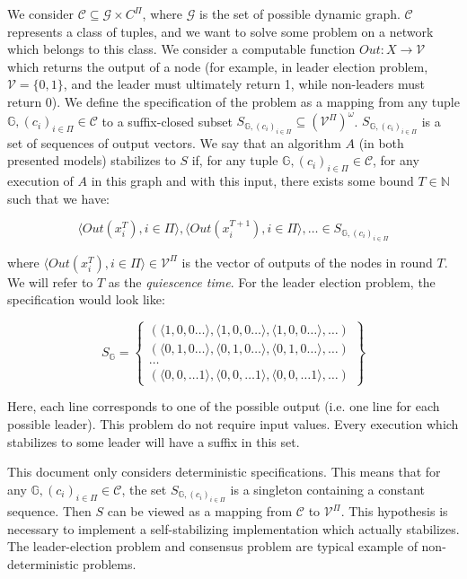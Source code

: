 \documentclass[11pt,letterpaper]{article}
\begin{document}
We consider $\mathcal{C} \subseteq \mathcal{G} \times C^\Pi$, where $\mathcal{G}$ is the set of possible dynamic graph.
$\mathcal{C}$ represents a class of tuples, and we want to solve some problem on a network which belongs to this class.
We consider a computable function $Out : X \rightarrow \mathcal{V}$ which returns the output of a node
(for example, in leader election problem, $\mathcal{V} = \{0,1\}$, and the leader must ultimately return 1, while non-leaders must return 0).
We define the specification of the problem as a mapping from any tuple $\mathds{G}, (c_i)_{i \in \Pi} \in \mathcal{C}$
to a suffix-closed subset $S_{\mathds{G}, (c_i)_{i \in \Pi}} \subseteq (\mathcal{V}^\Pi)^\omega$.
$S_{\mathds{G}, (c_i)_{i \in \Pi}}$ is a set of sequences of output vectors.
We say that an algorithm $A$ (in both presented models) stabilizes to $S$ if, for any tuple $\mathds{G}, (c_i)_{i \in \Pi} \in \mathcal{C}$,
for any execution of $A$ in this graph and with this input, there exists some bound $T \in \mathds{N}$ such that we have:

$$\langle Out(x^T_i), i \in \Pi \rangle, \langle Out(x^{T+1}_i), i \in \Pi \rangle, \dots \in S_{\mathds{G}, (c_i)_{i \in \Pi}}$$

where $\langle Out(x^T_i), i \in \Pi \rangle \in \mathcal{V}^\Pi$ is the vector of outputs of the nodes in round $T$.
We will refer to $T$ as the \textit{quiescence time}.
For the leader election problem, the specification would look like:

$$S_\mathds{G} = \left \{ \begin{array}{l}
	(\langle 1, 0, 0 \dots \rangle, \langle 1, 0, 0 \dots \rangle, \langle 1, 0, 0 \dots \rangle, \dots) \\
	(\langle 0, 1, 0 \dots \rangle, \langle 0, 1, 0 \dots \rangle, \langle 0, 1, 0 \dots \rangle, \dots) \\
	\dots \\
	(\langle 0, 0, \dots 1 \rangle, \langle 0, 0, \dots 1 \rangle, \langle 0, 0, \dots 1 \rangle, \dots)
\end{array} \right \}$$

Here, each line corresponds to one of the possible output (i.e. one line for each possible leader).
This problem do not require input values.
Every execution which stabilizes to some leader will have a suffix in this set.

This document only considers deterministic specifications.
This means that for any $\mathds{G}, (c_i)_{i \in \Pi} \in \mathcal{C}$, the set $S_{\mathds{G}, (c_i)_{i \in \Pi}}$ is a singleton containing a constant sequence.
Then $S$ can be viewed as a mapping from $\mathcal{C}$ to $\mathcal{V}^\Pi$.
This hypothesis is necessary to implement a self-stabilizing implementation which actually stabilizes.
The leader-election problem and consensus problem are typical example of non-deterministic problems.
\end{document}
